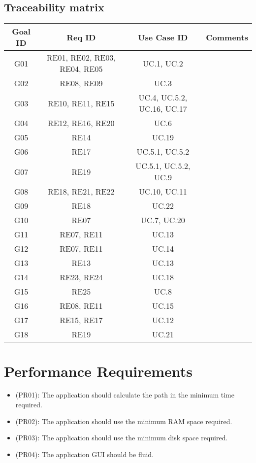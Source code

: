 \documentclass[a4paper,leqno]{book}
\begin{document}
\subsection{Traceability matrix}
\begin{tabular}{|c|c|c|c|}
	\hline 
	\textbf{Goal ID}&  \textbf{Req ID}& \textbf{Use Case ID} & \textbf{Comments} \\ 
	\hline  \hline
	G01& RE01, RE02, RE03, RE04, RE05 &  UC.1, UC.2&  \\ 
	\hline 
	G02&  RE08, RE09& UC.3 &  \\ 
	\hline 
	G03& RE10, RE11, RE15& UC.4, UC.5.2, UC.16, UC.17   &  \\ 
	\hline 
	G04& RE12, RE16, RE20 & UC.6 &  \\ 
	\hline 
	G05&  RE14& UC.19 &  \\ 
	\hline 
	G06&  RE17 & UC.5.1, UC.5.2  &  \\ 
	\hline 
	G07&  RE19& UC.5.1, UC.5.2, UC.9  &  \\ 
	\hline 
	G08&  RE18, RE21, RE22 &  UC.10, UC.11 &  \\ 
	\hline 
	G09& RE18  & UC.22 &  \\ 
	\hline 
	G10& RE07 & UC.7, UC.20&  \\ 
	\hline 
	G11&  RE07, RE11 & UC.13 &  \\ 
	\hline 
	G12& RE07, RE11 & UC.14 &  \\ 
	\hline 
	G13& RE13 & UC.13 &  \\ 
	\hline 
	G14&  RE23, RE24& UC.18  &  \\ 
	\hline 
	G15& RE25 & UC.8 &  \\ 
	\hline 
	G16& RE08, RE11& UC.15 &  \\ 
	\hline 
	G17& RE15, RE17 & UC.12 &  \\ 
		\hline 
	G18& RE19 & UC.21 &  \\ 
	\hline 
\end{tabular} 


\newpage
\section{Performance Requirements}
\begin{itemize}
\item (PR01): The application should calculate the path in the minimum time required.
\item (PR02): The application should use the minimum RAM space required.
\item (PR03): The application should use the minimum disk space required.
\item (PR04): The application GUI should be fluid.
\end{itemize}
\end{document}
